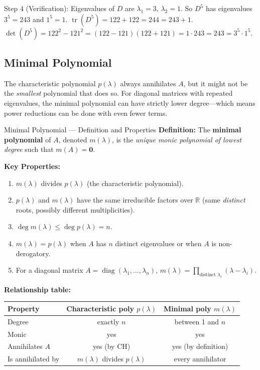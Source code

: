 \documentclass[12pt,a4paper]{article}
\begin{document}
Step 4 (Verification): Eigenvalues of $D$ are $\lambda_{1}=3$, $\lambda_{2}=1$.
So $D^{5}$ has eigenvalues $3^{5}=243$ and $1^{5}=1$.
$\operatorname{tr}(D^{5}) = 122+122 = 244 = 243+1$. \quad \checkmark
$\det(D^{5}) = 122^{2}-121^{2} = (122-121)(122+121) = 1\cdot 243 = 243 = 3^{5}\cdot 1^{5}$. \quad \checkmark

\subsection{Minimal Polynomial}

The characteristic polynomial $p(\lambda)$ always annihilates $A$, but it might
not be the \emph{smallest} polynomial that does so.
For diagonal matrices with repeated eigenvalues, the minimal polynomial can have
strictly lower degree---which means power reductions can be done with even fewer
terms.

\begin{infobox}{Minimal Polynomial --- Definition and Properties}
\textbf{Definition:}
The \textbf{minimal polynomial} of $A$, denoted $m(\lambda)$, is the
\emph{unique monic polynomial of lowest degree} such that $m(A) = \mathbf{0}$.

\textbf{Key Properties:}
\begin{enumerate}
  \item $m(\lambda)$ divides $p(\lambda)$ (the characteristic polynomial).
  \item $p(\lambda)$ and $m(\lambda)$ have the same irreducible factors over $\mathbb{R}$
        (same \emph{distinct} roots, possibly different multiplicities).
  \item $\deg m(\lambda) \leq \deg p(\lambda) = n$.
  \item $m(\lambda) = p(\lambda)$ when $A$ has $n$ distinct eigenvalues
        or when $A$ is non-derogatory.
  \item For a diagonal matrix $A = \operatorname{diag}(\lambda_{1},\ldots,\lambda_{n})$,
        $m(\lambda) = \prod_{\text{distinct }\lambda_{i}}(\lambda - \lambda_{i})$.
\end{enumerate}

\textbf{Relationship table:}
\begin{center}
\begin{tabular}{@{}lcc@{}}
\toprule
Property & Characteristic poly $p(\lambda)$ & Minimal poly $m(\lambda)$ \\
\midrule
Degree & exactly $n$ & between 1 and $n$ \\
Monic & yes & yes \\
Annihilates $A$ & yes (by CH) & yes (by definition) \\
Is annihilated by & $m(\lambda)$ divides $p(\lambda)$ & every annihilator \\
\bottomrule
\end{tabular}
\end{center}
\end{infobox}
\end{document}
